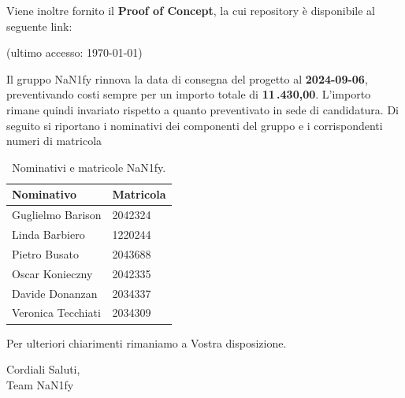 \documentclass[8pt]{article}
\begin{document}
\vspace{1em}
Viene inoltre fornito il \textbf{Proof of Concept}, la cui repository è disponibile al seguente link:
\begin{center}
	\textbf{\href{https://github.com/NaN1fy/SyncCity}{\color{myblue}{https://github.com/NaN1fy/SyncCity}}
    } (ultimo accesso: \today)
\end{center}
Il gruppo NaN1fy rinnova la data di consegna del progetto al \textbf{2024-09-06}, preventivando
costi sempre per un importo totale di \textbf{11\,.430,00\;\texteuro}. L’importo rimane quindi invariato
rispetto a quanto preventivato in sede di candidatura.
\clearpage
Di seguito si riportano i nominativi dei componenti del gruppo e i corrispondenti numeri di matricola\\
\begin{table}[h!]
	\centering
	\begin{tabular}{p{3cm} p{3cm}}
		\toprule
		\textbf{Nominativo} & \textbf{Matricola} \\
		\midrule
		Guglielmo Barison & 2042324 \\
		Linda Barbiero &  1220244 \\
		Pietro Busato & 2043688 \\
		Oscar Konieczny & 2042335 \\
		Davide Donanzan & 2034337 \\
		Veronica Tecchiati & 2034309 \\
		\bottomrule
	\end{tabular}
	\caption{Nominativi e matricole NaN1fy.}
	\label{table:Nominativi e matricole NaN1fy}
\end{table}
Per ulteriori chiarimenti rimaniamo a Vostra disposizione.
\vspace{1em}
\begin{flushleft}
	Cordiali Saluti,\\
	Team NaN1fy
\end{flushleft}
\clearpage
\newpage
\justifying
\end{document}
